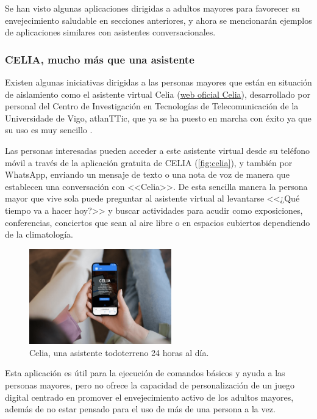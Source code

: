 Se han visto algunas aplicaciones dirigidas a adultos mayores para favorecer su envejecimiento saludable en secciones anteriores, y ahora se mencionarán ejemplos de aplicaciones similares con asistentes conversacionales. 

\subsubsection{CELIA, mucho más que una asistente}

Existen algunas iniciativas dirigidas a las personas mayores que están en situación de aislamiento como el asistente virtual Celia (\href{https://celiatecuida.com/}{web oficial Celia}), desarrollado por personal del Centro de Investigación en Tecnologías de Telecomunicación de la Universidade de Vigo, atlanTTic, que ya se ha puesto en marcha con éxito ya que su uso es muy sencillo \parencite{celia-app}.

Las personas interesadas pueden acceder a este asistente virtual desde su teléfono móvil a través de la aplicación gratuita de CELIA (\autoref{fig:celia}), y también por WhatsApp, enviando un mensaje de texto o una nota de voz de manera que establecen una conversación con <<Celia>>. De esta sencilla manera  la persona  mayor que vive sola puede preguntar al asistente virtual al levantarse <<¿Qué tiempo va a hacer hoy?>> y buscar actividades para acudir como exposiciones, conferencias, conciertos que sean al aire libre o en espacios cubiertos dependiendo de la climatología. 

\begin{figure}[H]
    \centering
    \includegraphics[width=0.55\textwidth]{imgs/celia.jpg}
    \caption{Celia, una asistente todoterreno 24 horas al día.}
    \label{fig:celia}
\end{figure}

Esta aplicación es útil para la ejecución de comandos básicos y ayuda a las personas mayores, pero no ofrece la capacidad de personalización de un juego digital centrado en promover el envejecimiento activo de los adultos mayores, además de no estar pensado para el uso de más de una persona a la vez.

